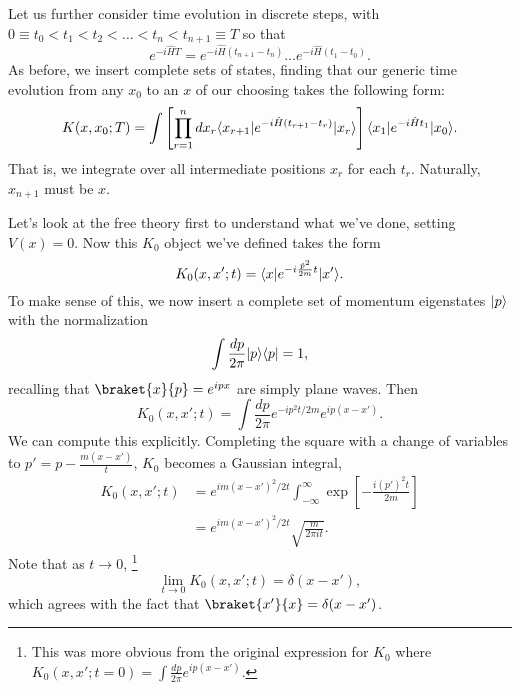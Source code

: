 Let us further consider time evolution in discrete steps, with $0\equiv t_0 < t_1 < t_2 < \ldots < t_n < t_{n+1} \equiv T$ so that
\begin{equation*}
    e^{-i\hat H T}= e^{-i\hat H(t_{n+1}-t_n)} \ldots e^{-i\hat H (t_1-t_0)}.
\end{equation*}
As before, we insert complete sets of states, finding that our generic time evolution from any $x_0$ to an $x$ of our choosing takes the following form:
\begin{equation}
    K(x,x_0;T) = \int \left[ \prod_{r=1}^n dx_r \langle x_{r+1}\rvert e^{-i\hat H(t_{r+1}-t_r)}\lvert x_r\rangle\right] \langle x_1\rvert e^{-i\hat H t_1}\lvert x_0\rangle.
\end{equation}
That is, we integrate over all intermediate positions $x_r$ for each $t_r$. Naturally, $x_{n+1}$ must be $x$.

Let's look at the free theory first to understand what we've done, setting $V(x)=0$. Now this $K_0$ object we've defined takes the form
\begin{equation}
    K_0(x,x'; t)=\langle x\rvert e^{-i \frac{\hat p^2}{2m} t}\lvert x'\rangle.
\end{equation}
To make sense of this, we now insert a complete set of momentum eigenstates $\lvert p\rangle$ with the normalization
\begin{equation*}
    \int \frac{dp}{2\pi}\lvert p\rangle\langle p\rvert=1,
\end{equation*}
recalling that $\braket{x}{p}=e^{ipx}$ are simply plane waves. Then
\begin{equation*}
    K_0 (x,x'; t)=\int \frac{dp}{2\pi} e^{-i p^2 t/2m} e^{ip (x-x')}.
\end{equation*}
We can compute this explicitly. Completing the square with a change of variables to $p'=p- \frac{m(x-x')}{t}$, $K_0$ becomes a Gaussian integral,
\begin{align*}
    K_0(x,x';t) &= e^{im(x-x')^2/2t} \int_{-\infty}^\infty \exp \left[-\frac{i(p')^2 t}{2m}\right]\\
    &= e^{im(x-x')^2/2t} \sqrt{\frac{m}{2\pi i t}}.
\end{align*}
Note that as $t\to 0$,%
    \footnote{This was more obvious from the original expression for $K_0$ where $K_0(x,x'; t=0)= \int \frac{dp}{2\pi} e^{ip(x-x')}.$}
\begin{equation*}
    \lim_{t\to 0} K_0(x,x'; t)=\delta(x-x'),
\end{equation*}
which agrees with the fact that $\braket{x'}{x}=\delta(x-x')$.


